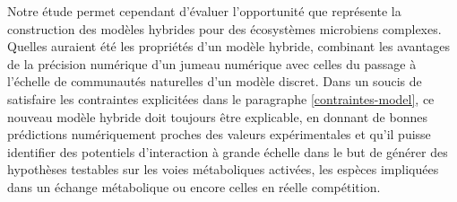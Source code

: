 \documentclass[../main.tex]{subfiles}
\begin{document}

Notre étude permet cependant d'évaluer l'opportunité que représente la construction des modèles hybrides pour des écosystèmes microbiens complexes.
Quelles auraient été les propriétés d'un modèle hybride, combinant les avantages de la précision numérique d'un jumeau numérique avec celles du passage à l'échelle de communautés naturelles d'un modèle discret.
Dans un soucis de satisfaire les contraintes explicitées dans le paragraphe \ref{contraintes-model}, ce nouveau modèle hybride doit toujours être explicable, en donnant de bonnes prédictions numériquement proches des valeurs expérimentales et qu'il puisse identifier des potentiels d'interaction à grande échelle dans le but de générer des hypothèses testables sur les voies métaboliques activées, les espèces impliquées dans un échange métabolique ou encore celles en réelle compétition.
\end{document}
